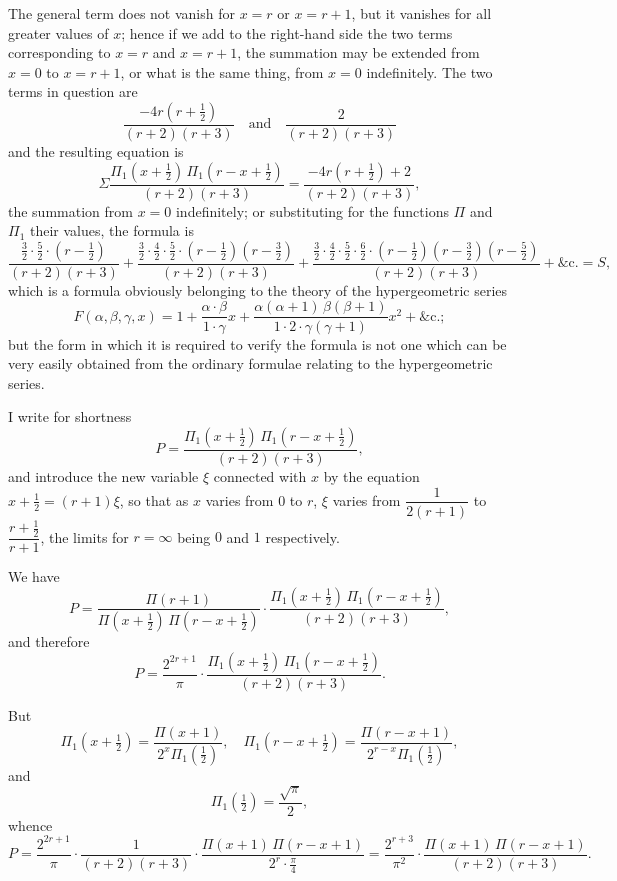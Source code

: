 \documentclass[11pt,a4paper]{book}
\begin{document}
{{The general term does not vanish for $x=r$ or $x=r+1$, but it vanishes for all greater values of $x$; hence if we add to the right-hand side the two terms corresponding to $x=r$ and $x=r+1$, the summation may be extended from $x=0$ to $x=r+1$, or what is the same thing, from $x=0$ indefinitely. The two terms in question are
\[
\frac{-4r(r+\tfrac{1}{2})}{(r+2)(r+3)} \quad \text{and} \quad \frac{2}{(r+2)(r+3)}
\]
and the resulting equation is
\[
\Sigma \frac{\Pi_1(x + \tfrac{1}{2})\,\Pi_1(r - x + \tfrac{1}{2})}{(r+2)(r+3)} = \frac{-4r(r+\tfrac{1}{2}) + 2}{(r+2)(r+3)},
\]
the summation from $x=0$ indefinitely; or substituting for the functions $\Pi$ and $\Pi_1$ their values, the formula is
\[
\frac{\tfrac{3}{2} \cdot \tfrac{5}{2} \cdot (r - \tfrac{1}{2})}{(r+2)(r+3)} + \frac{\tfrac{3}{2} \cdot \tfrac{4}{2} \cdot \tfrac{5}{2} \cdot (r - \tfrac{1}{2})(r - \tfrac{3}{2})}{(r+2)(r+3)} + \frac{\tfrac{3}{2} \cdot \tfrac{4}{2} \cdot \tfrac{5}{2} \cdot \tfrac{6}{2} \cdot (r - \tfrac{1}{2})(r - \tfrac{3}{2})(r - \tfrac{5}{2})}{(r+2)(r+3)} + \&\text{c.} = S,
\]
which is a formula obviously belonging to the theory of the hypergeometric series
\[
F(\alpha, \beta, \gamma, x) = 1 + \frac{\alpha \cdot \beta}{1 \cdot \gamma}x + \frac{\alpha(\alpha+1)\,\beta(\beta+1)}{1 \cdot 2 \cdot \gamma(\gamma+1)}x^2 + \&\text{c.};
\]
but the form in which it is required to verify the formula is not one which can be very easily obtained from the ordinary formulae relating to the hypergeometric series.

I write for shortness
\[
P = \frac{\Pi_1(x + \tfrac{1}{2})\,\Pi_1(r - x + \tfrac{1}{2})}{(r+2)(r+3)},
\]
and introduce the new variable $\xi$ connected with $x$ by the equation $x + \tfrac{1}{2} = (r+1)\xi$, so that as $x$ varies from $0$ to $r$, $\xi$ varies from $\dfrac{1}{2(r+1)}$ to $\dfrac{r+\tfrac{1}{2}}{r+1}$, the limits for $r=\infty$ being $0$ and $1$ respectively.

We have
\[
P = \frac{\Pi(r+1)}{\Pi(x+\tfrac{1}{2})\,\Pi(r-x+\tfrac{1}{2})} \cdot \frac{\Pi_1(x+\tfrac{1}{2})\,\Pi_1(r-x+\tfrac{1}{2})}{(r+2)(r+3)},
\]
and therefore
\[
P = \frac{2^{2r+1}}{\pi} \cdot \frac{\Pi_1(x+\tfrac{1}{2})\,\Pi_1(r-x+\tfrac{1}{2})}{(r+2)(r+3)}.
\]

But
\[
\Pi_1(x + \tfrac{1}{2}) = \frac{\Pi(x+1)}{2^x \Pi_1(\tfrac{1}{2})}, \quad \Pi_1(r - x + \tfrac{1}{2}) = \frac{\Pi(r-x+1)}{2^{r-x}\Pi_1(\tfrac{1}{2})},
\]
and
\[
\Pi_1(\tfrac{1}{2}) = \frac{\sqrt{\pi}}{2},
\]
whence
\[
P = \frac{2^{2r+1}}{\pi} \cdot \frac{1}{(r+2)(r+3)} \cdot \frac{\Pi(x+1)\,\Pi(r-x+1)}{2^r \cdot \tfrac{\pi}{4}} = \frac{2^{r+3}}{\pi^2} \cdot \frac{\Pi(x+1)\,\Pi(r-x+1)}{(r+2)(r+3)}.
\]

}}
\end{document}

